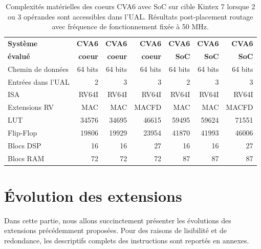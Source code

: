 \documentclass[../main.tex]{subfiles}
\begin{document}
\begin{table}[!tb]
    \centering
    \footnotesize
    \begin{tabular}{l|r|r|r|r|r|r}
    \toprule
        \textbf{Système}    & \textbf{CVA6} & \textbf{CVA6} & \textbf{CVA6} & \textbf{CVA6} & \textbf{CVA6} & \textbf{CVA6} \\
        \textbf{évalué}     & \textbf{coeur}& \textbf{coeur}& \textbf{coeur}& \textbf{SoC}  & \textbf{SoC}  & \textbf{SoC}  \\
    \midrule
        Chemin de données   & 64 bits       & 64 bits       & 64 bits       & 64 bits       & 64 bits       & 64 bits       \\
        Entrées dans l'UAL  & 2             & 3             & 3             & 2             & 3             & 3             \\ 
        ISA                 & RV64I         & RV64I         & RV64I         & RV64I         & RV64I         & RV64I         \\
        Extensions RV       & MAC           & MAC           & MACFD         & MAC           & MAC           & MACFD         \\
    \midrule
        LUT                 & 34576         & 34695         & 46615         & 59495         & 59624         & 71551         \\
        Flip-Flop           & 19806         & 19929         & 23954         & 41870         & 41993         & 46006         \\
        Blocs DSP           & 16            & 16            & 27            & 16            & 16            & 27            \\
        Blocs RAM           & 72            & 72            & 72            & 87            & 87            & 87            \\
    \bottomrule
    \end{tabular}
    \caption{Complexités matérielles des coeurs CVA6 avec SoC sur cible Kintex 7 lorsque 2 ou 3 opérandes sont accessibles dans l'UAL. Résultats post-placement routage avec fréquence de fonctionnement fixée à 50 MHz.}
    \label{tab:cva6:cost}
\end{table}
%
%
%
%
\section{Évolution des extensions}
%
%
%
%
Dans cette partie, nous allons succinctement présenter les évolutions des extensions précédemment proposées.
Pour des raisons de lisibilité et de redondance, les descriptifs complets des instructions sont reportés en annexes.
\end{document}
